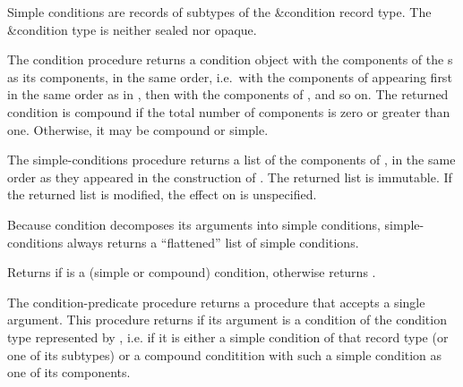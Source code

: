 \begin{entry}{%
}

Simple conditions are records of subtypes of the {\cf\&condition}
record type.  The {\cf\&condition} type is neither sealed nor opaque.
\end{entry}

\begin{entry}{%
}

  The {\cf condition}
procedure returns a condition object with the components of the
s as its components, in the same order, i.e.\ with the
components of  appearing first in the same order as in
, then with the components of , and so on.  The
returned condition is compound if the total number of components is
zero or greater than one.  Otherwise, it may be compound or simple.
\end{entry}

\begin{entry}{%
}

  The {\cf simple-conditions}
procedure returns a list of the components of , in the same
order as they appeared in the construction of .  The
returned list is immutable.  If the returned list is modified, the
effect on  is unspecified.

\begin{note}
  Because {\cf condition} decomposes its arguments into simple
  conditions, {\cf simple-conditions} always returns a ``flattened''
  list of simple conditions.
\end{note}
\end{entry}


\begin{entry}{%
}

Returns \schtrue{} if  is a (simple or compound) condition,
otherwise returns \schfalse.
\end{entry}

\begin{entry}{%
}

  The {\cf condition-predicate} procedure returns
a procedure that accepts a single argument.  This procedure returns
\schtrue{} if its argument is a condition of the condition type
represented by , i.e. if it is either a simple condition of
that record type (or one of its subtypes) or a compound conditition
with such a simple condition as one of its components.
\end{entry}

